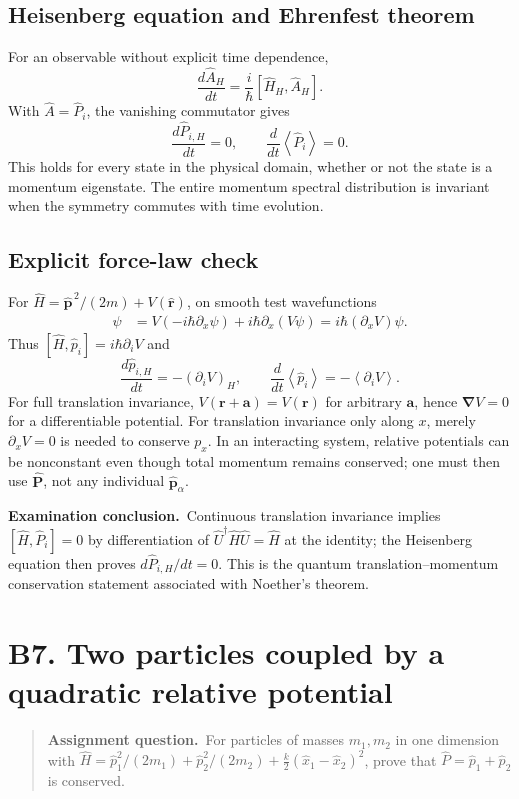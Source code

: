 \documentclass[11pt,a4paper]{article}
\theoremstyle{definition}
\newcommand{\avg}[1]{\left\langle #1\right\rangle}
\newcommand{\UU}{\hat U}
\newcommand{\grad}{\boldsymbol\nabla}
\newenvironment{question}{\begin{quote}\small\noindent\textbf{Assignment question.}\ }{\end{quote}}
\newcommand{\exam}[1]{\par\medskip\noindent\textbf{Examination conclusion.}\ #1\par}
\begin{document}
\subsection{Heisenberg equation and Ehrenfest theorem}
For an observable without explicit time dependence,
\begin{equation}
\frac{d\hat A_H}{dt}=\frac{i}{\hbar}[\hat H_H,\hat A_H].
\end{equation}
With \(\hat A=\hat P_i\), the vanishing commutator gives
\begin{equation}
\boxed{\frac{d\hat P_{i,H}}{dt}=0,\qquad\frac{d}{dt}\avg{\hat P_i}=0.}
\end{equation}
This holds for every state in the physical domain, whether or not the state is a momentum eigenstate. The entire momentum spectral distribution is invariant when the symmetry commutes with time evolution.
\subsection{Explicit force-law check}
For \(\hat H=\hat{\mathbf p}^{\,2}/(2m)+V(\hat{\mathbf r})\), on smooth test wavefunctions
\begin{align}
[V,\hat p_x]\psi
&=V(-i\hbar\partial_x\psi)+i\hbar\partial_x(V\psi)
=i\hbar(\partial_xV)\psi.
\end{align}
Thus \([\hat H,\hat p_i]=i\hbar\partial_iV\) and
\begin{equation}
\boxed{\frac{d\hat p_{i,H}}{dt}=-(\partial_i V)_H,\qquad
\frac{d}{dt}\avg{\hat p_i}=-\avg{\partial_iV}.}
\end{equation}
For full translation invariance, \(V(\mathbf r+\mathbf a)=V(\mathbf r)\) for arbitrary \(\mathbf a\), hence \(\grad V=0\) for a differentiable potential. For translation invariance only along \(x\), merely \(\partial_xV=0\) is needed to conserve \(p_x\). In an interacting system, relative potentials can be nonconstant even though total momentum remains conserved; one must then use \(\hat{\mathbf P}\), not any individual \(\hat{\mathbf p}_\alpha\).
\exam{Continuous translation invariance implies \([\hat H,\hat P_i]=0\) by differentiation of \(\UU^\dagger\hat H\UU=\hat H\) at the identity; the Heisenberg equation then proves \(d\hat P_{i,H}/dt=0\). This is the quantum translation--momentum conservation statement associated with Noether's theorem.}

\section{B7. Two particles coupled by a quadratic relative potential}
\begin{question}For particles of masses \(m_1,m_2\) in one dimension with \(\hat H=\hat p_1^2/(2m_1)+\hat p_2^2/(2m_2)+\frac k2(\hat x_1-\hat x_2)^2\), prove that \(\hat P=\hat p_1+\hat p_2\) is conserved.\end{question}
\end{document}
